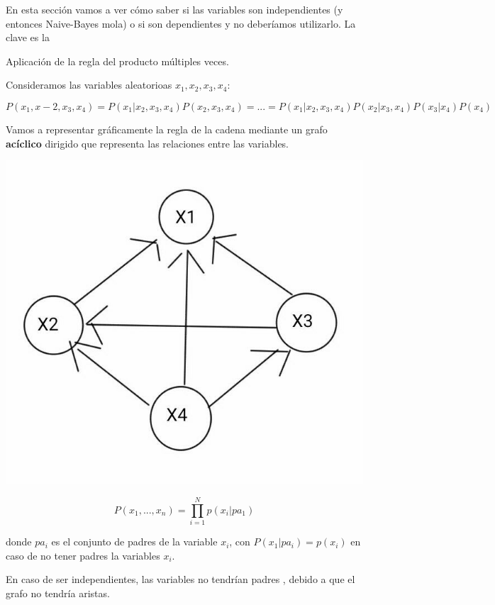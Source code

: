 \documentclass{apuntes}
\begin{document}
En esta sección vamos a ver cómo saber si las variables son independientes (y entonces Naive-Bayes mola) o si son dependientes y no deberíamos utilizarlo. La clave es la

\begin{defn}
Aplicación de la regla del producto múltiples veces.
\end{defn}

Consideramos las variables aleatorioas $x_1,x_2,x_3,x_4$:

\[P(x_1,x-2,x_3,x_4) = P(x_1|x_2,x_3,x_4)P(x_2,x_3,x_4) = ... = P(x_1|x_2,x_3,x_4) P(x_2|x_3,x_4) P(x_3|x_4) P(x_4)\]


Vamos a representar gráficamente la regla de la cadena mediante un grafo \textbf{acíclico} dirigido que representa las relaciones entre las variables.

\includegraphics[scale=0.5]{img/grafo1.jpg}

\begin{defn}
\[P(x_1,...,x_n) = \prod_{i=1}^N p(x_i | pa_1)\]

donde $pa_i$ es el conjunto de padres de la variable $x_i$, con $P(x_1|pa_i) = p(x_i)$ en caso de no tener padres la variables $x_i$.

\end{defn}
\obs En caso de ser independientes, las variables no tendrían padres , debido a que el grafo no tendría aristas.
\end{document}
